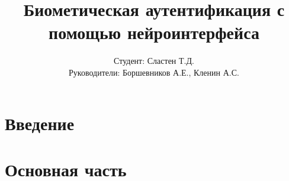 \documentclass{beamer}
\title{Биометическая аутентификация с помощью нейроинтерфейса}
\author{Студент: Сластен Т.Д. \\ Руководители: Боршевников А.Е., Кленин А.С.}
\institute{Б8303а Прикладная математика и информатика}
\date{}
\begin{document}
\maketitle

\section{Введение}




\section{Основная часть}
\end{document}
